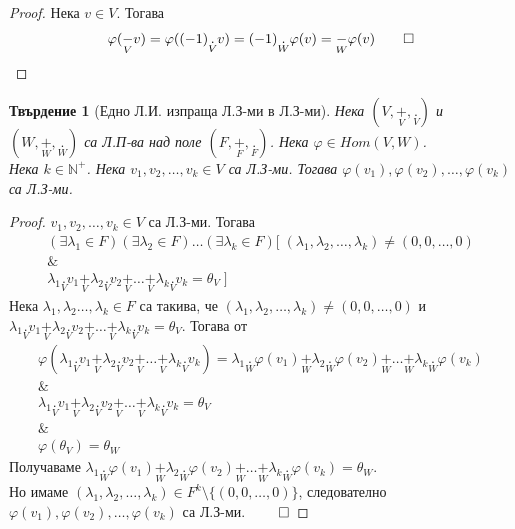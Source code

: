 \documentclass[12pt]{article}
\newtheorem{proposition}{Твърдение}%
\begin{document}
\begin{proof}
Нека \(v \in V\). Тогава
\begin{align*}
\varphi(\underset{V}{-}v) = \varphi((-1) \underset{V}{.} v ) = (-1) \underset{W}{.} \varphi(v) = \underset{W}{-}\varphi(v) \qed
\end{align*}
\end{proof}

\begin{proposition}[Едно Л.И. изпраща Л.З-ми в Л.З-ми]
Нека \((V, \underset{V}{+}, \underset{V}{.})\) и \((W, \underset{W}{+}, \underset{W}{.})\) са Л.П-ва над поле \((F, \underset{F}{+}, \underset{F}{.})\).
Нека \(\varphi \in Hom(V, W)\). \\
Нека \(k \in \mathbb{N}^+\). Нека \(v_1, v_2, \dots, v_k \in V\) са Л.З-ми.
Тогава \(\varphi(v_1), \varphi(v_2), \dots, \varphi(v_k)\) са Л.З-ми.
\end{proposition}

\begin{proof}
\(v_1, v_2, \dots, v_k \in V\) са Л.З-ми. Тогава
\begin{align*}
(\exists \lambda_1 \in F)(\exists \lambda_2 \in F)\dots(\exists \lambda_k \in F)[\; (\lambda_1, \lambda_2, \dots, \lambda_k) \neq (0, 0, \dots, 0) \\
\& 
\\ \lambda_1 \underset{V}{.} v_1 \underset{V}{+} \lambda_2 \underset{V}{.} v_2 \underset{V}{+} \dots \underset{V}{+} \lambda_k \underset{V}{.} v_k  = \theta_V \;]
\end{align*}
Нека \(\lambda_1, \lambda_2 \dots, \lambda_k \in F\) са такива, че \((\lambda_1, \lambda_2, \dots, \lambda_k) \neq (0, 0, \dots, 0)\)
и \(\lambda_1 \underset{V}{.} v_1 \underset{V}{+} \lambda_2 \underset{V}{.} v_2 \underset{V}{+} \dots \underset{V}{+} \lambda_k \underset{V}{.} v_k  = \theta_V\).
Тогава от
\begin{align*}
    \varphi(\lambda_1 \underset{V}{.} v_1 \underset{V}{+} \lambda_2 \underset{V}{.} v_2 \underset{V}{+} \dots \underset{V}{+} \lambda_k \underset{V}{.} v_k) =
    \lambda_1 \underset{W}{.} \varphi(v_1) \underset{W}{+} \lambda_2 \underset{W}{.} \varphi(v_2) \underset{W}{+} \dots \underset{W}{+} \lambda_k \underset{W}{.} \varphi(v_k) \\
    \& \\
    \lambda_1 \underset{V}{.} v_1 \underset{V}{+} \lambda_2 \underset{V}{.} v_2 \underset{V}{+} \dots \underset{V}{+} \lambda_k \underset{V}{.} v_k  = \theta_V \\
    \& \\
    \varphi(\theta_V) = \theta_W
\end{align*}
Получаваме \(\lambda_1 \underset{W}{.} \varphi(v_1) \underset{W}{+} \lambda_2 \underset{W}{.} \varphi(v_2) \underset{W}{+} \dots \underset{W}{+} \lambda_k \underset{W}{.} \varphi(v_k) = \theta_W\).
\\
Но имаме \((\lambda_1, \lambda_2, \dots, \lambda_k) \in F^k \setminus \{(0, 0, \dots, 0)\}\),
следователно \(\varphi(v_1), \varphi(v_2), \dots, \varphi(v_k)\) са Л.З-ми. \(\qed\)
\end{proof}
\end{document}
